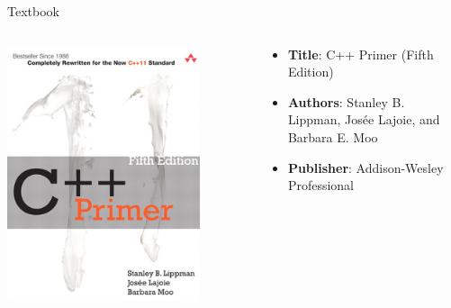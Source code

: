 \begin{frame}[fragile]{ Textbook}

	\begin{columns}
		\begin{column}{0.4\textwidth}
			\begin{center}
				\includegraphics[width=0.8\textwidth]{day8_pm/img/1-cppprimer}
			\end{center}

		\end{column}
		\begin{column}{0.6\textwidth}
			\begin{itemize}
				\item \textbf{Title}: C++ Primer (Fifth Edition)
				\item \textbf{Authors}: Stanley B. Lippman, Josée Lajoie, and Barbara E. Moo
				\item \textbf{Publisher}: Addison-Wesley Professional
			\end{itemize}
		\end{column}
	\end{columns}
\end{frame}

